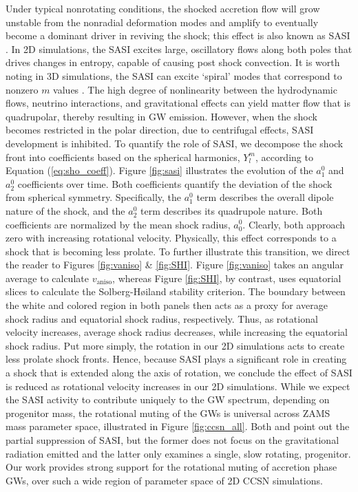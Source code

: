 \documentclass[twocolumn,times]{aastex62}  %
\begin{document}
Under typical nonrotating conditions, the shocked accretion flow will grow unstable from the nonradial deformation modes and amplify to eventually become a dominant driver in reviving the shock; this effect is also known as SASI \citep{scheck:2008,marek:2009a}.  In 2D simulations, the SASI excites large, oscillatory flows along both poles that drives changes in entropy, capable of causing post shock convection.  It is worth noting in 3D simulations, the SASI can excite `spiral' modes that correspond to nonzero $m$ values \citep{blondin:2007,kuroda:2016}.  The high degree of nonlinearity between the hydrodynamic flows, neutrino interactions, and gravitational effects can yield matter flow that is quadrupolar, thereby resulting in GW emission.  However, when the shock becomes restricted in the polar direction, due to centrifugal effects, SASI development is inhibited.  To quantify the role of SASI, we decompose the shock front into coefficients based on the spherical harmonics, $Y_l^m$, according to Equation (\ref{eq:sho_coeff}). Figure \ref{fig:sasi} illustrates the evolution of the $a_1^0$ and $a_2^0$ coefficients over time.  Both coefficients quantify the deviation of the shock from spherical symmetry.  Specifically, the $a_1^0$ term describes the overall dipole nature of the shock, and the $a_2^0$ term describes its quadrupole nature.  Both coefficients are normalized by the mean shock radius, $a^0_0$.  Clearly, both approach zero with increasing rotational velocity.  Physically, this effect corresponds to a shock that is becoming less prolate.  To further illustrate this transition, we direct the reader to Figures \ref{fig:vaniso} \& \ref{fig:SHI}.  Figure \ref{fig:vaniso} takes an angular average to calculate $v_{\mathrm{aniso}}$, whereas Figure \ref{fig:SHI}, by contrast, uses equatorial slices  to calculate the Solberg-H{\o}iland stability criterion.  The boundary between the white and colored region in both panels then acts as a proxy for average shock radius and equatorial shock radius, respectively.  Thus, as rotational velocity increases, average shock radius decreases, while increasing the equatorial shock radius.  Put more simply, the rotation in our 2D simulations acts to create less prolate shock fronts.  Hence, because SASI plays a significant role in creating a shock that is extended along the axis of rotation, we conclude the effect of SASI is reduced as rotational velocity increases in our 2D simulations.
While we expect the SASI activity to contribute uniquely to the GW spectrum, depending on progenitor mass, the rotational muting of the GWs is universal across ZAMS mass parameter space, illustrated in Figure \ref{fig:ccsn_all}. 
Both \citet{burrows:2007}  and \citet{moro:2018} point out the partial suppression of SASI, but the former does not focus on the gravitational radiation emitted and the latter only examines a single, slow rotating, progenitor.  Our work provides strong support for the rotational muting of accretion phase GWs, over such a wide region of parameter space of 2D CCSN simulations. 
 
\end{document}
